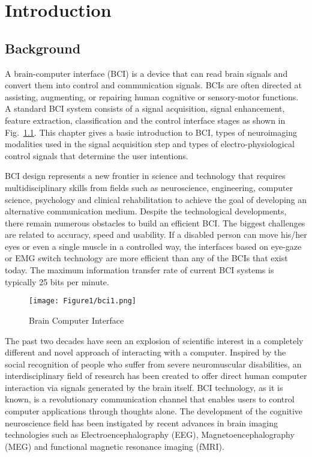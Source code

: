 \chapter{Introduction}

\section{Background}
A brain-computer interface (BCI) is a device that can read brain signals and convert them into control and communication signals. BCIs are often directed at assisting, augmenting, or repairing human cognitive or sensory-motor functions. A standard BCI system consists of a signal acquisition, signal enhancement, feature extraction, classification and the control interface stages as shown in Fig.~\ref{int}. This chapter gives a basic introduction to BCI, types of neuroimaging modalities used in the signal acquisition step and types of electro-physiological control signals that determine the user intentions.

BCI design represents a new frontier in science and technology that requires multidisciplinary skills from fields such as neuroscience, engineering, computer science, psychology and clinical rehabilitation to achieve the goal of developing an alternative communication medium. Despite the technological developments, there remain numerous obstacles to build an efficient BCI. The biggest challenges are related to accuracy, speed and usability. If a disabled person can move his/her eyes or even a single muscle in a controlled way, the interfaces based on eye-gaze or EMG switch technology are more efficient than any of the BCIs that exist today. The maximum information transfer rate of current BCI systems is typically 25 bits per minute.

\begin{figure}
\centering
\texttt{[image: Figure1/bci1.png]}
\caption{Brain Computer Interface}
\label{int}
\end{figure}
    
The past two decades have seen an explosion of scientific interest in a completely different and novel approach of interacting with a computer. Inspired by the social recognition of people who suffer from severe neuromuscular disabilities, an interdisciplinary field of research has been created to offer direct human computer interaction via signals generated by the brain itself. BCI technology, as it is known, is a revolutionary communication channel that enables users to control computer applications through thoughts alone. The development of the cognitive neuroscience field has been instigated by recent advances in brain imaging technologies such as Electroencephalography (EEG), Magnetoencephalography (MEG) and functional magnetic resonance imaging (fMRI). 

